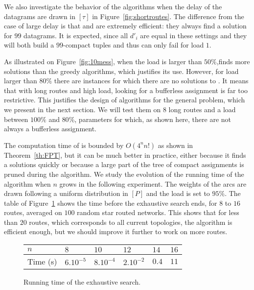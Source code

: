 We also investigate the behavior of the algorithms when the delay of the datagrams are drawn in $[\tau]$ in 
Figure~\ref{fig:shortroutes}. The difference from the case of large delay is that \compactpair and \compactfit are extremely efficient: they always find a solution for $99$ datagrams. It is expected, since all $d'_i$ are equal in these settings and 
they will both build a $99$-compact tuples and thus can only fail for load $1$.


       As illustrated on Figure~\ref{fig:10mess}, when the load is larger than $50\%$,\ESCA finds more solutions than the greedy algorithms, which justifies its use. However, for load larger than $80\%$ there are instances for which there are no solutions to \pazl. It means that with long routes and high load, looking for a bufferless assignment is far too restrictive. This justifies the design of algorithms for the general \pall problem, which we present in the next section. We will test them on $8$ long routes and a load between $100\%$ and $80\%$, parameters for which, as shown here, there are not always a bufferless assignment.
      
       The computation time of \ESCA is bounded by $O(4^nn!)$ as shown in Theorem~\ref{th:FPT}, but it can be much better in practice, either because it finds a solutions quickly or because a large part of the tree of compact assignments is pruned during the algorithm. We study the evolution of the running time  of the algorithm when $n$ grows in the following experiment. The weights of the arcs are drawn following a uniform distribution in $[P]$ and the load is set to $95\%$.  The table of Figure~\ref{fig:table} shows the time before the exhaustive search ends, for $8$ to $16$ routes, averaged on $100$ random star routed networks. This shows that for less than $20$ routes, which corresponds to all current topologies, the algorithm is efficient enough, but we should improve it further to work on more routes.
       
             \begin{figure}[h]
         \begin{center}
         \begin{tabularx}{0.9\textwidth}{|l|X|X|X|X|X|}
    \hline
   $n$ & $8$ & $10$& $12$&$14$& $16$\\
    \hline
   Time (s) & $6.10^{-5}$&$8.10^{-4}$&$2.10^{-2}$& $0.4$& $11$\\
    \hline
      \end{tabularx}
      \end{center}
      \caption{Running time of the exhaustive search.}
      \label{fig:table}
      \end{figure}

